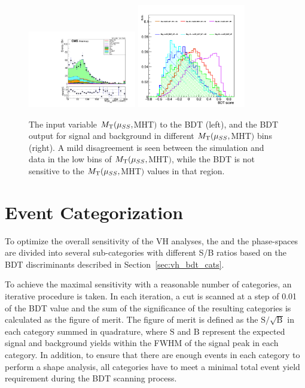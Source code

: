 \begin{figure}[!htb]
  \centering
  \captionsetup{justification=justified}
  \includegraphics[width=0.42\textwidth]{pics/VH_sec/valid_BDT_WH/muSS_MHT_MT.pdf}
  \includegraphics[width=0.42\textwidth]{pics/VH_sec/valid_BDT_WH/check_MT_plot.png}
  \caption{The input variable $M_{\mathrm{T}}(\mu_{SS}, $MHT$)$ to the \WH BDT (left), 
           and the BDT output for signal and background in different $M_{\mathrm{T}}(\mu_{SS}, $MHT$)$ bins (right).
           A mild disagreement is seen between the simulation and data in the low bins of $M_{\mathrm{T}}(\mu_{SS}, $MHT$)$,
           while the BDT is not sensitive to the $M_{\mathrm{T}}(\mu_{SS}, $MHT$)$ values in that region.}
  \label{fig:wh_MT_check}
\end{figure}

\clearpage
\section{Event Categorization}\label{sec:vh_event_cats}

To optimize the overall sensitivity of the VH analyses, 
the \WH and the \ZH phase-spaces are divided into several sub-categories with different S/B ratios based on the BDT discriminants described in Section~\ref{sec:vh_bdt_cats}. 
 
To achieve the maximal sensitivity with a reasonable number of categories, 
an iterative procedure is taken.  
In each iteration, a cut is scanned at a step of 0.01 of the BDT value and the sum of
the significance of the resulting categories is calculated as the figure of merit. 
The figure of merit is defined as the $\mathrm{S}/\sqrt{\mathrm{B}}$ in each category 
summed in quadrature, where $\mathrm{S}$ and $\mathrm{B}$ represent the expected 
signal and background yields within the FWHM of the signal peak in each category.
In addition, to ensure that there are enough events in each category to perform a shape analysis,
all categories have to meet a minimal total event yield requirement during the BDT scanning process.

